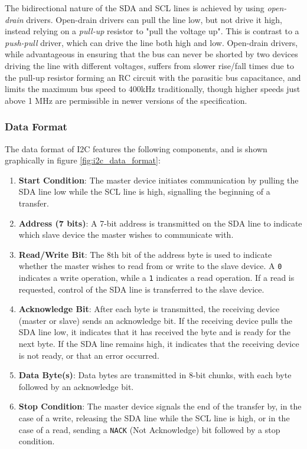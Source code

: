 \documentclass[main.tex]{subfiles}
\begin{document}
\noindent The bidirectional nature of the SDA and SCL lines is achieved by using \textit{open-drain} drivers. Open-drain drivers can pull the line low, but not drive it high, instead relying on a \textit{pull-up} resistor to "pull the voltage up". This is contrast to a \textit{push-pull} driver, which can drive the line both high and low. Open-drain drivers, while advantageous in ensuring that the bus can never be shorted by two devices driving the line with different voltages, suffers from slower rise/fall times due to the pull-up resistor forming an RC circuit with the parasitic bus capacitance, and limits the maximum bus speed to 400kHz traditionally, though higher speeds just above 1 MHz are permissible in newer versions of the specification.

\subsubsection{Data Format}
The data format of I2C features the following components, and is shown graphically in figure \ref{fig:i2c_data_format}:
\begin{enumerate}
    \item \textbf{Start Condition}: The master device initiates communication by pulling the SDA line low while the SCL line is high, signalling the beginning of a transfer.
    \item \textbf{Address (7 bits)}: A 7-bit address is transmitted on the SDA line to indicate which slave device the master wishes to communicate with.
    \item \textbf{Read/Write Bit}: The 8th bit of the address byte is used to indicate whether the master wishes to read from or write to the slave device. A \texttt{0} indicates a write operation, while a \texttt{1} indicates a read operation. If a read is requested, control of the SDA line is transferred to the slave device.
    \item \textbf{Acknowledge Bit}: After each byte is transmitted, the receiving device (master or slave) sends an acknowledge bit. If the receiving device pulls the SDA line low, it indicates that it has received the byte and is ready for the next byte. If the SDA line remains high, it indicates that the receiving device is not ready, or that an error occurred.
    \item \textbf{Data Byte(s)}: Data bytes are transmitted in 8-bit chunks, with each byte followed by an acknowledge bit.
    \item \textbf{Stop Condition}: The master device signals the end of the transfer by, in the case of a write, releasing the SDA line while the SCL line is high, or in the case of a read, sending a \texttt{NACK} (Not Acknowledge) bit followed by a stop condition.
\end{enumerate}
\end{document}
